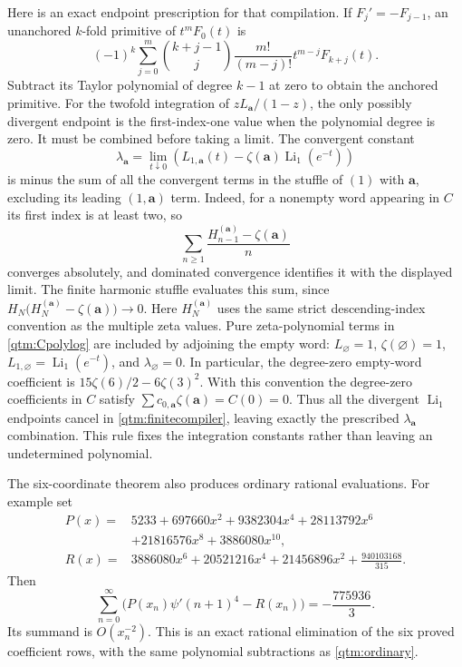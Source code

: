 \documentclass[11pt,a4paper]{article}
\numberwithin{equation}{section}
\theoremstyle{plain}
\theoremstyle{definition}
\theoremstyle{remark}
\begin{document}
Here is an exact endpoint prescription for that compilation.  If
$F_j'=-F_{j-1}$, an unanchored $k$-fold primitive of $t^mF_0(t)$ is
\begin{equation}\label{qtm:primitivecompiler}
 (-1)^k\sum_{j=0}^m\binom{k+j-1}{j}
      \frac{m!}{(m-j)!}t^{m-j}F_{k+j}(t).
\end{equation}
Subtract its Taylor polynomial of degree $k-1$ at zero to obtain
the anchored primitive.  For the twofold integration of
$zL_{\boldsymbol a}/(1-z)$, the only possibly divergent endpoint
is the first-index-one value when the polynomial degree is zero.
It must be combined before taking a limit.  The convergent constant
\[
 \lambda_{\boldsymbol a}
  =\lim_{t\downarrow0}
   \left(L_{1,\boldsymbol a}(t)
             -\zeta(\boldsymbol a)\operatorname{Li}_1(e^{-t})\right)
\]
is minus the sum of all the convergent terms in the stuffle of
$(1)$ with $\boldsymbol a$, excluding its leading $(1,\boldsymbol a)$
term.  Indeed, for a nonempty word appearing in $C$ its first index
is at least two, so
\[
 \sum_{n\ge1}\frac{H_{n-1}^{(\boldsymbol a)}
                         -\zeta(\boldsymbol a)}{n}
\]
converges absolutely, and dominated convergence identifies it with
the displayed limit.  The finite harmonic stuffle evaluates this
sum, since
$H_N\bigl(H_N^{(\boldsymbol a)}-\zeta(\boldsymbol a)\bigr)\to0$.
Here $H_N^{(\boldsymbol a)}$ uses the same strict descending-index
convention as the multiple zeta values.  Pure zeta-polynomial terms in
\eqref{qtm:Cpolylog} are included by adjoining the empty word:
$L_{\varnothing}=1$, $\zeta(\varnothing)=1$,
$L_{1,\varnothing}=\operatorname{Li}_1(e^{-t})$, and
$\lambda_{\varnothing}=0$.
In particular, the degree-zero empty-word coefficient is
$15\zeta(6)/2-6\zeta(3)^2$.
With this convention the degree-zero coefficients in $C$ satisfy
$\sum c_{0,\boldsymbol a}\zeta(\boldsymbol a)=C(0)=0$.
Thus all the divergent $\operatorname{Li}_1$ endpoints cancel in
\eqref{qtm:finitecompiler}, leaving exactly the prescribed
$\lambda_{\boldsymbol a}$ combination.  This rule fixes the integration
constants rather than leaving an undetermined polynomial.

The six-coordinate theorem also produces ordinary rational evaluations.
For example set
\begin{align*}
 P(x)={}&5233+697660x^2+9382304x^4+28113792x^6\\
        &+21816576x^8+3886080x^{10},\\
 R(x)={}&3886080x^6+20521216x^4+21456896x^2
                         +\frac{940103168}{315}.
\end{align*}
Then
\begin{equation}\label{qtm:rational}
 \boxed{\displaystyle
 \sum_{n=0}^{\infty}\bigl(P(x_n)\psi'(n+1)^4-R(x_n)\bigr)
       =-\frac{775936}{3}.}
\end{equation}
Its summand is $O(x_n^{-2})$.  This is an exact rational elimination
of the six proved coefficient rows, with the same polynomial
subtractions as \eqref{qtm:ordinary}.
\end{document}
